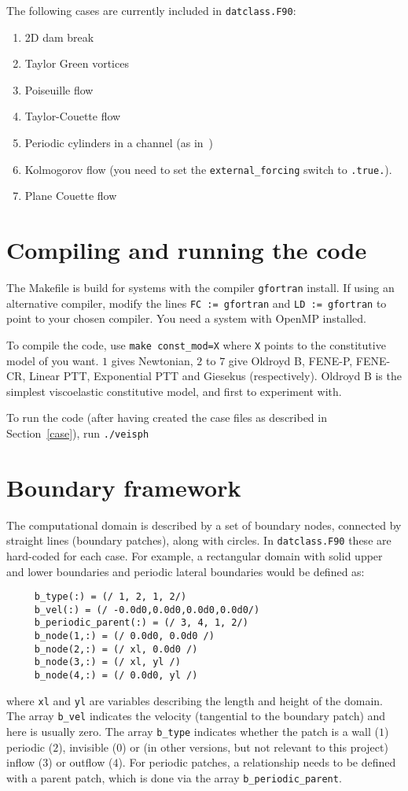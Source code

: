\documentclass[notitlepage]{revtex4-2}
\begin{document}
The following cases are currently included in \verb|datclass.F90|:
\begin{enumerate}
\item 2D dam break
\item Taylor Green vortices
\item Poiseuille flow
\item Taylor-Couette flow
\item Periodic cylinders in a channel (as in~\cite{vazquez_2012})
\item Kolmogorov flow (you need to set the \verb|external_forcing| switch to \verb|.true.|).
\item Plane Couette flow
\end{enumerate}

\section{Compiling and running the code}

The Makefile is build for systems with the compiler \verb|gfortran| install. If using an alternative compiler, modify the lines \verb|FC := gfortran| and \verb|LD := gfortran| to point to your chosen compiler. You need a system with OpenMP installed.

To compile the code, use \verb|make const_mod=X| where \verb|X| points to the constitutive model of you want. $1$ gives Newtonian, $2$ to $7$ give Oldroyd B, FENE-P, FENE-CR, Linear PTT, Exponential PTT and Giesekus (respectively). Oldroyd B is the simplest viscoelastic constitutive model, and first to experiment with.

To run the code (after having created the case files as described in Section~\ref{case}), run \verb|./veisph|

\section{Boundary framework}

The computational domain is described by a set of boundary nodes, connected by straight lines (boundary patches), along with circles. In \texttt{datclass.F90} these are hard-coded for each case. For example, a rectangular domain with solid upper and lower boundaries and periodic lateral boundaries would be defined as:
\begin{verbatim}
     b_type(:) = (/ 1, 2, 1, 2/)
     b_vel(:) = (/ -0.0d0,0.0d0,0.0d0,0.0d0/)    
     b_periodic_parent(:) = (/ 3, 4, 1, 2/)
     b_node(1,:) = (/ 0.0d0, 0.0d0 /)
     b_node(2,:) = (/ xl, 0.0d0 /)
     b_node(3,:) = (/ xl, yl /)
     b_node(4,:) = (/ 0.0d0, yl /)
\end{verbatim}
where \texttt{xl} and \texttt{yl} are variables describing the length and height of the domain. The array \verb!b_vel! indicates the velocity (tangential to the boundary patch) and here is usually zero. The array \verb!b_type! indicates whether the patch is a wall ($1$) periodic ($2$), invisible ($0$) or (in other versions, but not relevant to this project) inflow ($3$) or outflow ($4$). For periodic patches, a relationship needs to be defined with a parent patch, which is done via the array \verb!b_periodic_parent!.
\end{document}
